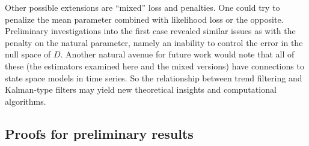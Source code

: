 \documentclass[ejs,noshowframe]{imsart}
\theoremstyle{plain}
\theoremstyle{definition}
\begin{document}
Other possible extensions are ``mixed'' loss and penalties. One could try to
penalize the mean parameter combined with likelihood loss or the opposite.
Preliminary investigations into the first case revealed similar issues as with
the penalty on the natural parameter, namely an inability to control the error
in the null space of $D$. Another natural avenue for future work would note that
all of these 
(the estimators examined here and the mixed versions) have connections to state
space models in 
time series. So the relationship between trend filtering and Kalman-type filters
may yield new theoretical insights and computational algorithms.



\begin{appendix}


\section{Proofs for preliminary results}
\label{sec:app-preliminary}

\end{appendix}
\end{document}
